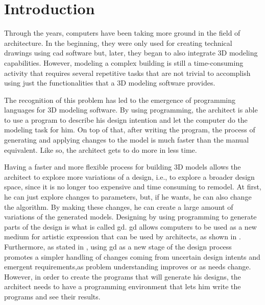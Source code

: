 
\section{Introduction}
\label{sec:introduction}



Through the years, computers have been taking more ground in the field of architecture.
In the beginning, they were only used for creating technical drawings using \gls{cad} software but, later, they began to also integrate 3D modeling capabilities.
However, modeling a complex building is still a time-consuming activity that requires several repetitive tasks that are not trivial to accomplish using just the functionalities that a 3D modeling software provides.

The recognition of this problem has led to the emergence of programming languages for 3D modeling software.
By using programming, the architect is able to use a program to describe his design intention and let the computer do the modeling task for him.
On top of that, after writing the program, the process of generating and applying changes to the model is much faster than the manual equivalent.
Like so, the architect gets to do more in less time.

Having a faster and more flexible process for building 3D models allows the architect to explore more variations of a design, i.e., to explore a broader design space, since it is no longer too expensive and time consuming to remodel.
At first, he can just explore changes to parameters, but, if he wants, he can also change the algorithm.
By making these changes, he can create a large amount of variations of the generated models.
Designing by using programming to generate parts of the design is what is called \gls{gd}.
\gls{gd} allows computers to be used as a new medium for artistic expression\cite{Maeda:2001:DN:559503} that can be used by architects, as shown in \cite{terzidis2003expressive}.
Furthermore, as stated in \cite{leitao2014pushing}, using \gls{gd} as a new stage of the design process promotes a simpler handling of changes coming from uncertain design intents and emergent requirements,as problem understanding improves or as needs change.
However, in order to create the programs that will generate his designs, the architect needs to have a programming environment that lets him write the programs and see their results.


